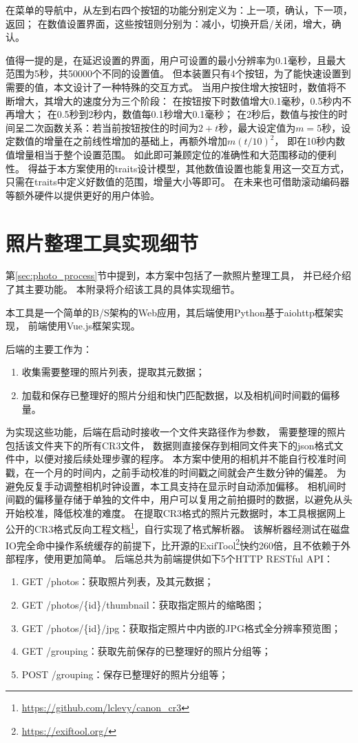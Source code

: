 在菜单的导航中，从左到右四个按钮的功能分别定义为：上一项，确认，下一项，返回；
在数值设置界面，这些按钮则分别为：减小，切换开启/关闭，增大，确认。

值得一提的是，在延迟设置的界面，用户可设置的最小分辨率为0.1毫秒，且最大范围为5秒，共50000个不同的设置值。
但本装置只有4个按钮，为了能快速设置到需要的值，本文设计了一种特殊的交互方式。
当用户按住增大按钮时，数值将不断增大，其增大的速度分为三个阶段：
在按钮按下时数值增大0.1毫秒，0.5秒内不再增大；
在0.5秒到2秒内，数值每0.1秒增大0.1毫秒；
在2秒后，数值与按住的时间呈二次函数关系：若当前按钮按住的时间为$2+t$秒，最大设定值为$m=5$秒，设定数值的增量在之前线性增加的基础上，再额外增加$m(t/10)^2$，
即在10秒内数值增量相当于整个设置范围。
如此即可兼顾定位的准确性和大范围移动的便利性。
得益于本方案使用的traits设计模型，其他数值设置也能复用这一交互方式，只需在traits中定义好数值的范围，增量大小等即可。
在未来也可借助滚动编码器等额外硬件以提供更好的用户体验。

\chapter{照片整理工具实现细节}
\label{app:pick_photo_impl}

第\ref{sec:photo_process}节中提到，本方案中包括了一款照片整理工具，
并已经介绍了其主要功能。
本附录将介绍该工具的具体实现细节。

本工具是一个简单的B/S架构的Web应用，其后端使用Python基于aiohttp框架实现，
前端使用Vue.js框架实现。

后端的主要工作为：
\begin{enumerate}
\item 收集需要整理的照片列表，提取其元数据；
\item 加载和保存已整理好的照片分组和快门匹配数据，以及相机间时间戳的偏移量。
\end{enumerate}
为实现这些功能，后端在启动时接收一个文件夹路径作为参数，
需要整理的照片包括该文件夹下的所有CR3文件，
数据则直接保存到相同文件夹下的json格式文件中，以便对接后续处理步骤的程序。
本方案中使用的相机并不能自行校准时间戳，在一个月的时间内，之前手动校准的时间戳之间就会产生数分钟的偏差。
为避免反复手动调整相机时钟设置，本工具支持在显示时自动添加偏移。
相机间时间戳的偏移量存储于单独的文件中，用户可以复用之前拍摄时的数据，以避免从头开始校准，降低校准的难度。
在提取CR3格式的照片元数据时，本工具根据网上公开的CR3格式反向工程文档\footnote{\url{https://github.com/lclevy/canon_cr3}}，自行实现了格式解析器。
该解析器经测试在磁盘IO完全命中操作系统缓存的前提下，比开源的ExifTool\footnote{\url{https://exiftool.org/}}快约260倍，且不依赖于外部程序，使用更加简单。
后端总共为前端提供如下5个HTTP RESTful API：
\begin{enumerate}
\item GET /photos：获取照片列表，及其元数据；
\item GET /photos/\{id\}/thumbnail：获取指定照片的缩略图；
\item GET /photos/\{id\}/jpg：获取指定照片中内嵌的JPG格式全分辨率预览图；
\item GET /grouping：获取先前保存的已整理好的照片分组等；
\item POST /grouping：保存已整理好的照片分组等；
\end{enumerate}

